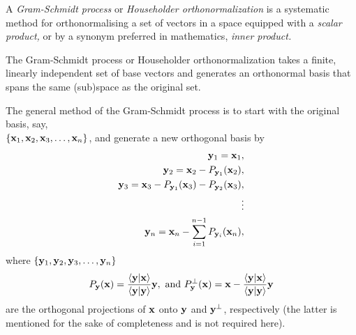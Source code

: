 A {\em Gram-Schmidt process}\cite{Leon-MR3054730}
or {\em Householder orthonormalization}
is a systematic method for orthonormalising a set of vectors
in a space equipped with a {\em scalar product,}
or by a synonym preferred in mathematics, {\em inner product.}


The Gram-Schmidt process or Householder
orthonormalization
takes a finite, linearly independent set
of base vectors
and generates an orthonormal basis that spans the same (sub)space as the original set.

The general method of the Gram-Schmidt process  is to start with the original basis,
say,  \\
$\{
{\bf x}_1,
{\bf x}_2,
{\bf x}_3,
\ldots ,
{\bf x}_n
\}$,
and generate a new orthogonal basis
by
\begin{equation}
\begin{split}
{\bf y}_1={\bf x}_1,\\
{\bf y}_2={\bf x}_2 - P_{{\bf y}_1}({\bf x}_2),\\
{\bf y}_3={\bf x}_3 - P_{{\bf y}_1}({\bf x}_3)- P_{{\bf y}_2}({\bf x}_3),\\
 \vdots \\
{\bf y}_n={\bf x}_n -\sum_{i=1}^{n-1} P_{{\bf y}_i}({\bf x}_n),
\end{split}
\end{equation}
where
$\{
{\bf y}_1,
{\bf y}_2,
{\bf y}_3,
\ldots ,
{\bf y}_n
\}$
\begin{equation}
P_{{\bf y}}({\bf x}) =
\frac{\langle {\bf y} \vert  {\bf x}\rangle }
{\langle {\bf y}\vert {\bf y} \rangle }
{\bf y}
,\textrm{ and }
P_{{\bf y}}^\perp ({\bf x}) = {\bf x} -
\frac{\langle {\bf y} \vert  {\bf x}\rangle }
{\langle {\bf y}\vert {\bf y} \rangle }
{\bf y}
\end{equation}
are the orthogonal projections of ${\bf x}$ onto ${\bf y}$ and ${\bf y}^\perp$, respectively
(the latter is mentioned for the sake of completeness and is not required here).
